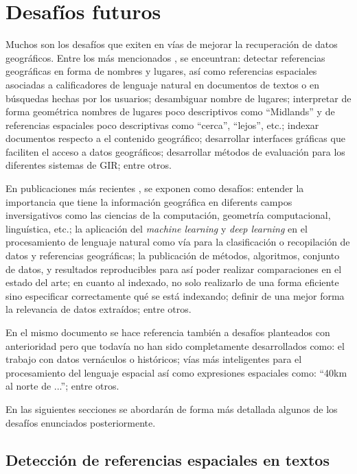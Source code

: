 \section{Desafíos futuros}\label{sec:chall}

Muchos son los desafíos que exiten en vías de mejorar la recuperación de datos
geográficos. Entre los más mencionados \cite{purves2014}, se enceuntran:
detectar referencias geográficas en forma de nombres y lugares, así como
referencias espaciales asociadas a calificadores de lenguaje natural en
documentos de textos o en búsquedas hechas por los usuarios; desambiguar nombre
de lugares; interpretar de forma geométrica nombres de lugares poco
descriptivos como ``Midlands'' y de referencias espaciales poco descriptivas
como ``cerca'', ``lejos'', etc.; indexar documentos respecto a el contenido
geográfico; desarrollar interfaces gráficas que faciliten el acceso a datos
geográficos; desarrollar métodos de evaluación para los diferentes sistemas de
GIR; entre otros.

En publicaciones más recientes \cite{purves2018}, se exponen como desafíos:
entender la importancia que tiene la información geográfica en diferents campos
inversigativos como las ciencias de la computación, geometría computacional,
linguística, etc.; la aplicación del \emph{machine learning} y \emph{deep
learning} en el procesamiento de lenguaje natural como vía para la
clasificación o recopilación de datos y referencias geográficas; la publicación
de métodos, algoritmos, conjunto de datos, y resultados reproducibles para así
poder realizar comparaciones en el estado del arte; en cuanto al indexado, no
solo realizarlo de una forma eficiente sino especificar correctamente qué se
está indexando; definir de una mejor forma la relevancia de datos extraídos;
entre otros.

En el mismo documento se hace referencia también a desafíos planteados con
anterioridad pero que todavía no han sido completamente desarrollados como: el
trabajo con datos vernáculos o históricos; vías más inteligentes para el
procesamiento del lenguaje espacial así como expresiones espaciales como:
``40km al norte de ...''; entre otros.

En las siguientes secciones se abordarán de forma más detallada algunos de los
desafíos enunciados posteriormente.

\subsection{Detección de referencias espaciales en textos}\label{sec:detect}

